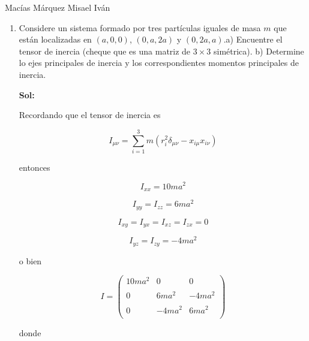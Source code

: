 \documentclass[12pt,a4paper]{article}
\begin{document}
Macías Márquez Misael Iván

\begin{enumerate}






\item Considere un sistema formado por tres partículas iguales de masa $m$ que están localizadas en $(a,0,0)$, $(0,a,2a)$ y $(0,2a,a)$.a) Encuentre el tensor de inercia  (cheque que es una matriz de $3 \times  3$ simétrica).  b) Determine lo ejes principales de inercia y los correspondientes momentos principales de inercia.

\textbf{Sol:}

Recordando que el tensor  de inercia es

\begin{equation*}
    I _{\mu \nu} = \sum_{i = 1}^{3} m (r_{i}^{2} \delta_{\mu \nu} - x_{i \mu} x_{i  \nu})
\end{equation*}

entonces

\begin{equation*}
    I_{xx} = 10 m a^2
\end{equation*}

\begin{equation*}
    I_{yy} = I_{zz} = 6 m a^2
\end{equation*}



\begin{equation*}
    I_{xy} = I_{yx} = I_{xz} = I_{zx} = 0
\end{equation*}

\begin{equation*}
    I_{yz} = I_{zy} = -4ma^2 
\end{equation*}

o bien

\begin{equation*}
    I = \left( \begin{array}{lcc}
            10m a^2 & 0 & 0 \\
            \\ 0 & 6ma^2 & -4ma^2 \\
            \\ 0 & -4ma^2 & 6 ma^2 \\
        \end{array}
        \right)
\end{equation*}

donde


\end{enumerate}
\end{document}
